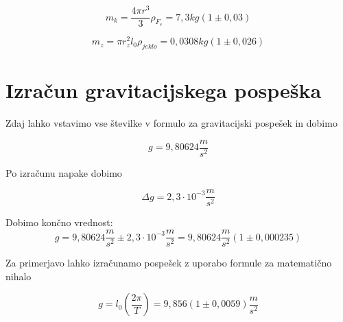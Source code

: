 \documentclass[a4paper]{report}
\begin{document}
\[ m_k = \frac{4\pi r^3}{3}\rho_{F_e} = 7,3 kg (1\pm0,03)
\]

 \[m_z = \pi r_z^2 l_0 \rho_{jeklo} = 0,0308 kg(1\pm0,026) 
\]

\section*{Izračun gravitacijskega pospeška}

Zdaj lahko vstavimo vse številke v formulo za gravitacijski pospešek in dobimo

\[g = 9,80624 \frac{m}{s^2}\]

Po izračunu napake dobimo

\[\Delta g  = 2,3\cdot 10^{-3} \frac{m}{s^2}\]

Dobimo končno vrednost:\\

\[g= 9,80624 \frac{m}{s^2} \pm 2,3\cdot 10^{-3} \frac{m}{s^2} = 9,80624 \frac{m}{s^2} (1\pm 0,000235)\]

Za primerjavo lahko izračunamo pospešek z uporabo formule za matematično nihalo 

\[ g=l_0 (\frac{2\pi}{T}) = 9,856 (1\pm 0,0059) \frac{m}{s^2}\]
\end{document}
